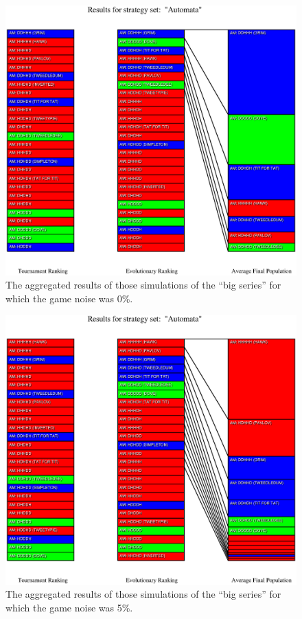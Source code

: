 \begin{figure}
\begin{center}
\includegraphics[width=20cm]{tables/Automata_G0.000.eps}
\caption{\label{Automata_G0000} The aggregated results of those
simulations of the ``big series'' for which the game noise was 0\%.}
\end{center}
\end{figure}

\begin{figure}
\begin{center}
\includegraphics[width=20cm]{tables/Automata_G0.050.eps}
\caption{\label{Automata_G0050} The aggregated results of those
simulations of the ``big series'' for which the game noise was 5\%.}
\end{center}
\end{figure}

